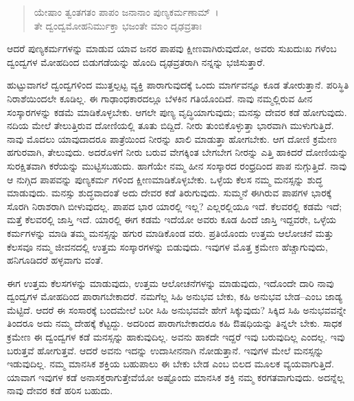 \begin{verse}
ಯೇಷಾಂ ತ್ವಂತಗತಂ ಪಾಪಂ ಜನಾನಾಂ ಪುಣ್ಯಕರ್ಮಣಾಮ್~।\\ತೇ ದ್ವಂದ್ವಮೋಹನಿರ್ಮುಕ್ತಾ ಭಜಂತೇ ಮಾಂ ದೃಢವ್ರತಾಃ 
\end{verse}

{\small ಆದರೆ ಪುಣ್ಯಕರ್ಮಗಳನ್ನು ಮಾಡುವ ಯಾವ ಜನರ ಪಾಪವು ಕ್ಷೀಣವಾಗಿರುವುದೋ, ಅವರು ಸುಖದುಃಖ ಗಳೆಂಬ ದ್ವಂದ್ವಗಳ ಮೋಹದಿಂದ ಬಿಡುಗಡೆಯನ್ನು ಹೊಂದಿ ದೃಢವ್ರತರಾಗಿ ನನ್ನನ್ನು ಭಜಿಸುತ್ತಾರೆ.}

ಹುಟ್ಟುವಾಗಲೆ ದ್ವಂದ್ವಗಳಿಂದ ಮುತ್ತಲ್ಪಟ್ಟ ವ್ಯಕ್ತಿ ಪಾರಾಗುವುದಕ್ಕೆ ಒಂದು ಮಾರ್ಗವನ್ನೂ ಕೂಡ ತೋರುತ್ತಾನೆ. ಪರಿಸ್ಥಿತಿ ನಿರಾಶೆಯಿಂದಲೇ ಕೂಡಿಲ್ಲ. ಈ ಗಾಢಾಂಧಕಾರದಲ್ಲೂ ಬೆಳಕಿನ ಗತಿಯೊಂದಿದೆ. ನಾವು ನಮ್ಮಲ್ಲಿರುವ ಹೀನ ಸಂಸ್ಕಾರಗಳನ್ನು ಕಡಮೆ ಮಾಡಿಕೊಳ್ಳಬೇಕು. ಆಗಲೇ ಪುಣ್ಯ ವೃದ್ಧಿಯಾಗುವುದು; ಮನಸ್ಸು ದೇವರ ಕಡೆ ಹೋಗುವುದು. ನದಿಯ ಮೇಲೆ ತೇಲುತ್ತಿರುವ ದೋಣಿಯಲ್ಲಿ ತೂತು ಬಿದ್ದಿದೆ. ನೀರು ತುಂಬಿಕೊಳ್ಳುತ್ತಾ ಭಾರವಾಗಿ ಮುಳುಗುತ್ತಿದೆ. ನಾವು ಮೊದಲು ಯಾವುದಾದರೂ ಪಾತ್ರೆಯಿಂದ ನೀರನ್ನು ಖಾಲಿ ಮಾಡುತ್ತಾ ಹೋಗಬೇಕು. ಆಗ ದೋಣಿ ಕ್ರಮೇಣ ಹಗುರವಾಗಿ, ತೇಲುವುದು. ಅದರೊಳಗೆ ನೀರು ಬರುವ ವೇಗಕ್ಕಿಂತ ಬೇಗಬೇಗ ನೀರನ್ನು ಎತ್ತಿ ಹಾಕಿದರೆ ದೋಣಿಯನ್ನು ಸುರಕ್ಷಿತವಾಗಿ ಕರೆಯನ್ನು ಮುಟ್ಟಿಸಬಹುದು. ಹಾಗೆಯೇ ನಮ್ಮ ಹೀನ ಸಂಸ್ಕಾರದ ರಂಧ್ರದಿಂದ ಪಾಪ ನುಗ್ಗುತ್ತಿದೆ. ನಾವು ಆ ನುಗ್ಗಿದ ಪಾಪವನ್ನು ಪುಣ್ಯಕರ್ಮ ಗಳಿಂದ ಕ್ಷೀಣಮಾಡಿಕೊಳ್ಳಬೇಕು. ಒಳ್ಳೆಯ ಕೆಲಸ ನಮ್ಮ ಮನಸ್ಸನ್ನು ಶುದ್ಧ ಮಾಡುವುದು. ಮನಸ್ಸು ಶುದ್ಧವಾದಂತೆ ಅದು ದೇವರ ಕಡೆ ತಿರುಗುವುದು. ಸುಮ್ಮನೆ ಈಗಿರುವ ಪಾಪಗಳ ಭಾರಕ್ಕೆ ಸೊರಗಿ ನಿರಾಶರಾಗಿ ಬೀಳುವುದಲ್ಲ. ಪಾಪದ ಭಾರ ಯಾರಲ್ಲಿ ಇಲ್ಲ? ಎಲ್ಲರಲ್ಲಿಯೂ ಇದೆ. ಕೆಲವರಲ್ಲಿ ಕಡಮೆ ಇದೆ; ಮತ್ತೆ ಕೆಲವರಲ್ಲಿ ಜಾಸ್ತಿ ಇದೆ. ಯಾರಲ್ಲಿ ಈಗ ಕಡಮೆ ಇದೆಯೋ ಅವರು ಕೂಡ ಹಿಂದೆ ಜಾಸ್ತಿ ಇದ್ದವರೇ, ಒಳ್ಳೆಯ ಕರ್ಮಗಳನ್ನು ಮಾಡಿ ತಮ್ಮ ಮನಸ್ಸನ್ನು ಹಗುರ ಮಾಡಿಕೊಂಡ ವರು. ಪ್ರತಿಯೊಂದು ಉತ್ತಮ ಆಲೋಚನೆ ಮತ್ತು ಕೆಲಸವೂ ನಮ್ಮ ಜೀವನದಲ್ಲಿ ಉತ್ತಮ ಸಂಸ್ಕಾರಗಳನ್ನು ಬಿಡುವುದು. ಇವುಗಳ ಮೊತ್ತ ಕ್ರಮೇಣ ಹೆಚ್ಚಾಗುವುದು, ಹನಿಗೂಡಿದರೆ ಹಳ್ಳವಾಗು ವಂತೆ.

ಈಗ ಉತ್ತಮ ಕೆಲಸಗಳನ್ನು ಮಾಡುವುದು, ಉತ್ತಮ ಆಲೋಚನೆಗಳನ್ನು ಮಾಡುವುದು, ಇದೊಂದೇ ದಾರಿ ನಾವು ದ್ವಂದ್ವಗಳ ಮೋಹದಿಂದ ಪಾರಾಗಬೇಕಾದರೆ. ನಮಗೆಲ್ಲ ಸಿಹಿ ಅನುಭವ ಬೇಕು, ಕಹಿ ಅನುಭವ ಬೇಡ–ಎಂಬ ಜಾಡ್ಯ ಮೆಟ್ಟಿದೆ. ಆದರೆ ಈ ಸಂಸಾರಕ್ಕೆ ಬಂದಮೇಲೆ ಬರೀ ಸಿಹಿ ಅನುಭವವೇ ಹೇಗೆ ಸಿಕ್ಕುವುದು? ಸಿಕ್ಕಿದ ಸಿಹಿ ಅನುಭವವನ್ನೇ ತಿಂದರೂ ಅದು ನಮ್ಮ ದೇಹಕ್ಕೆ ಕೆಟ್ಟದ್ದು. ಅದರಿಂದ ಪಾರಾಗಬೇಕಾದರೂ ಕಹಿ ಔಷಧಿಯನ್ನು ತಿನ್ನಲೇ ಬೇಕು. ಸಾಧಕ ಕ್ರಮೇಣ ಈ ದ್ವಂದ್ವಗಳ ಕಡೆ ಮನಸ್ಸನ್ನು ಹಾಕುವುದಿಲ್ಲ. ಅವನು ಹಾಕದೇ ಇದ್ದರೆ ಇವು ಬರುವುದಿಲ್ಲ ಎಂದಲ್ಲ. ಇವು ಬರುತ್ತವೆ ಹೋಗುತ್ತವೆ. ಆದರೆ ಅವನು ಇದನ್ನು ಉದಾಸೀನನಾಗಿ ನೋಡುತ್ತಾನೆ. ಇವುಗಳ ಮೇಲೆ ಮನಸ್ಸನ್ನು ಇಡುವುದಿಲ್ಲ. ನಮ್ಮ ಮಾನಸಿಕ ಶಕ್ತಿಯ ಬಹುಪಾಲು ಈ ಬೇಕು ಬೇಡ ಎಂಬ ಬಿಲದ ಮೂಲಕ ವ್ಯಯವಾಗುತ್ತಿದೆ. ಯಾವಾಗ ಇವುಗಳ ಕಡೆ ಅನಾಸಕ್ತರಾಗುತ್ತೇವೆಯೋ ಅಷ್ಟೊಂದು ಮಾನಸಿಕ ಶಕ್ತಿ ನಮ್ಮ ಕರಗತವಾಗುವುದು. ಅದನ್ನೆಲ್ಲ ನಾವು ದೇವರ ಕಡೆ ಹರಿಸ ಬಹುದು.

